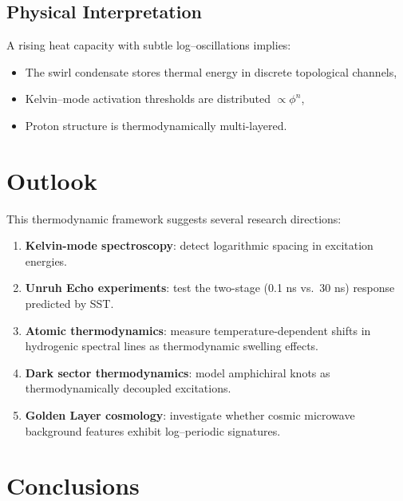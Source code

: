 \documentclass[11pt]{article}
\begin{document}
        \subsection{Physical Interpretation}

            A rising heat capacity with subtle log--oscillations implies:
            \begin{itemize}
                \item The swirl condensate stores thermal energy in discrete topological
                channels,
                \item Kelvin--mode activation thresholds are distributed $\propto \phi^n$,
                \item Proton structure is thermodynamically multi-layered.
            \end{itemize}

    \section{Outlook}

        This thermodynamic framework suggests several research directions:
        \begin{enumerate}
            \item \textbf{Kelvin-mode spectroscopy}: detect logarithmic spacing in excitation
            energies.
            \item \textbf{Unruh Echo experiments}: test the two-stage (0.1 ns vs.\ 30 ns)
            response predicted by SST.
            \item \textbf{Atomic thermodynamics}: measure temperature-dependent shifts in
            hydrogenic spectral lines as thermodynamic swelling effects.
            \item \textbf{Dark sector thermodynamics}: model amphichiral knots as
            thermodynamically decoupled excitations.
            \item \textbf{Golden Layer cosmology}: investigate whether cosmic microwave
            background features exhibit log--periodic signatures.
        \end{enumerate}

    \section{Conclusions}
\end{document}
